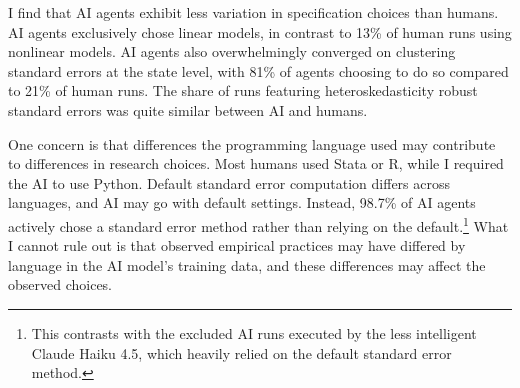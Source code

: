 \documentclass[
  12pt]{article}
\begin{document}
\begin{table}[!htbp]
\centering
\caption{Estimation choices by researcher type}
\label{tab:methods}
\small
{}
\caption*{\footnotesize \textbf{Notes:} Estimation choices are inferred from each generated model specification and execution metadata. Human results use Task 1 submissions from \citet{huntingtonklein2025sources}.}
\end{table}
\FloatBarrier

I find that AI agents exhibit less variation in specification choices
than humans. AI agents exclusively chose linear models, in contrast to
13\% of human runs using nonlinear models. AI agents also overwhelmingly
converged on clustering standard errors at the state level, with 81\% of
agents choosing to do so compared to 21\% of human runs. The share of
runs featuring heteroskedasticity robust standard errors was quite
similar between AI and humans.

One concern is that differences the programming language used may
contribute to differences in research choices. Most humans used Stata or
R, while I required the AI to use Python. Default standard error
computation differs across languages, and AI may go with default
settings. Instead, 98.7\% of AI agents actively chose a standard error
method rather than relying on the
default.\footnote{This contrasts with the excluded AI runs executed by the less intelligent Claude Haiku 4.5, which heavily relied on the default standard error method.}
What I cannot rule out is that observed empirical practices may have
differed by language in the AI model's training data, and these
differences may affect the observed choices.
\end{document}
